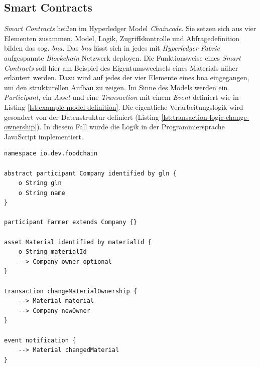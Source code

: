 \subsection{Smart Contracts}
\textit{Smart Contracts} heißen im Hyperledger Model \textit{Chaincode}. Sie setzen sich aus vier Elementen zusammen. Model, Logik, Zugriffskontrolle und Abfragedefinition bilden das sog. \textit{\acf{bna}}. Das \textit{\ac{bna}} lässt sich in jedes mit \textit{Hyperledger Fabric} aufgespannte \textit{Blockchain} Netzwerk deployen. Die Funktionsweise eines \textit{Smart Contracts} soll hier am Beispiel des Eigentumswechsels eines Materials näher erläutert werden. Dazu wird auf jedes der vier Elemente eines \ac{bna} eingegangen, um den strukturellen Aufbau zu zeigen. Im Sinne des Models werden ein \textit{Participant}, ein \textit{Asset} und eine \textit{Transaction} mit einem \textit{Event} definiert wie in Listing \ref{lst:example-model-definition}. Die eigentliche Verarbeitungslogik wird gesondert von der Datenstruktur definiert (Listing \ref{lst:transaction-logic-change-ownership}). In diesem Fall wurde die Logik in der Programmiersprache JavaScript implementiert.

\begin{lstlisting}[caption={Model Example Definition},label=lst:example-model-definition]
namespace io.dev.foodchain

abstract participant Company identified by gln {
    o String gln
    o String name
}

participant Farmer extends Company {}

asset Material identified by materialId {
    o String materialId
    --> Company owner optional
}

transaction changeMaterialOwnership {
    --> Material material
    --> Company newOwner
}

event notification {
    --> Material changedMaterial
}
\end{lstlisting}

